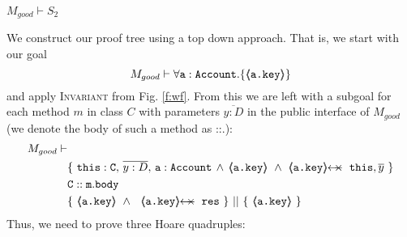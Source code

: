 \begin{lemma}
\label{lemma:exampleKeyProtect}
$M_{good} \vdash S_2$
\end{lemma}
\begin{proofO}
We construct our proof tree using a top down approach.  That is, we start with our goal
$$M_{good} \vdash \forall {\mbox{\normalfont{\texttt{a}}}:\mbox{\normalfont{\texttt{Account}}}}.{{\{}}{\langle\!\!\langle \mbox{\normalfont{\texttt{\mbox{\normalfont{\texttt{a.key}}}}}} \rangle\!\!\rangle}{{\}}}$$
and apply  \textsc{Invariant} from Fig. \ref{f:wf}.
From this we are left with a subgoal for each method $m$ in  class $C$ with parameters $\overline{y:D}$ in the public interface of $M_{good}$ (we denote the body of such a method as ::.):
\small
\begin{align*}
M_{good} \vdash & \\
		& \{ \ \prg{this}:\prg{C},\, \overline{y:D},\, \prg{a}:\prg{Account}\, \wedge\,
		   {\inside{\prg{a.key}}}\ \wedge\       \protectedFrom {\prg{a.key}} {\prg{this},\overline y} \  \} \\
		& \prg{C}::\prg{m}.\prg{body}\  \\
		&
                   \{\ {\inside{\prg{a.key}}}\ \wedge\ \ \protectedFrom {\prg{a.key}} {\prg{res}}   \ \}\ ||\ \{\ {\inside{\prg{a.key} } } \ \} \\
\end{align*}
\normalsize
{Thus, we need to prove   three Hoare quadruples:}
    

\end{proofO}
